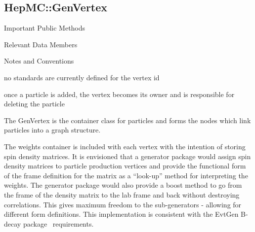 \documentclass[11pt,letterpaper]{article}
\begin{document}
\subsection{HepMC::GenVertex}
\begin{myitemize}{Important Public Methods}
\end{myitemize}
\begin{myitemize}{Relevant Data Members}
\end{myitemize}
\begin{myitemize}{Notes and Conventions}
  \item no standards are currently defined for the vertex id
  \item once a particle is added, the vertex becomes its owner and is
    responsible for deleting the particle
\end{myitemize}

The GenVertex is the container class for particles and forms the nodes
which link particles into a graph structure.

The weights container is included with each vertex with the intention
of storing spin density matrices. It is envisioned that a
generator package would assign spin density matrices to particle
production vertices and provide the functional form of the frame
definition for the matrix as a ``look-up'' method for interpreting
the weights. The generator package would also provide a boost method
to go from the frame of the density matrix to the lab frame and back
without destroying correlations. This gives maximum freedom to the
sub-generators - allowing for different form definitions.
This implementation is consistent with the EvtGen B-decay
package~\cite{evtgen} requirements. 
\end{document}
